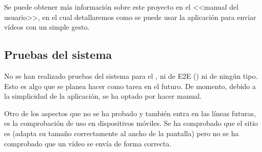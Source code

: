 Se puede obtener más información sobre este proyecto en el <<manual del usuario>>, en el cual detallaremos como se puede usar la aplicación para enviar vídeos con un simple gesto.

\subsection{Pruebas del sistema}

No se han realizado pruebas del sistema para el , ni de E2E () ni de ningún tipo. Esto es algo que se planea hacer como tarea en el futuro. De momento, debido a la simplicidad de la aplicación, se ha optado por hacer  manual.

Otro de los aspectos que no se ha probado y también entra en las líneas futuras, es la comprobación de uso en dispositivos móviles. Se ha comprobado que el sitio es  (adapta su tamaño correctamente al ancho de la pantalla) pero no se ha comprobado que un vídeo se envía de forma correcta.